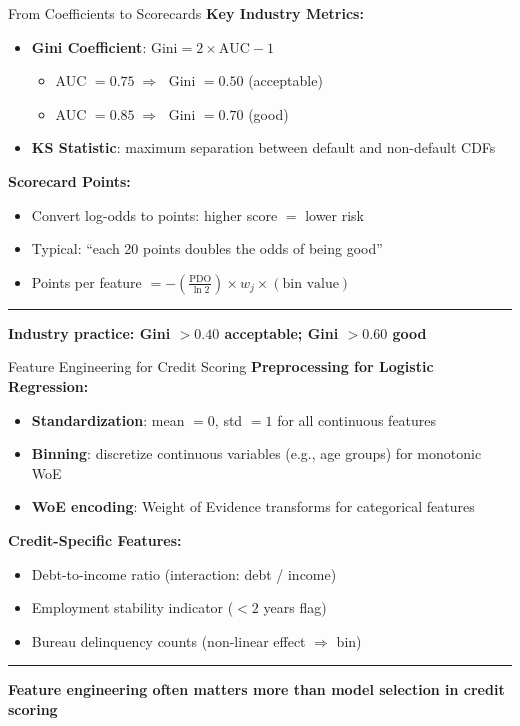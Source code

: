 \documentclass[8pt,aspectratio=169]{beamer}
\newcommand{\bottomnote}[1]{%
\vfill
\vspace{-2mm}
\textcolor{mllavender2}{\rule{\textwidth}{0.4pt}}
\vspace{1mm}
\footnotesize
\textbf{#1}
}
\begin{document}
\begin{frame}[t]{From Coefficients to Scorecards}
\textbf{Key Industry Metrics:}
\begin{itemize}
\item \textbf{Gini Coefficient}: $\text{Gini} = 2 \times \text{AUC} - 1$
  \begin{itemize}
    \item AUC $= 0.75 \;\Rightarrow\;$ Gini $= 0.50$ (acceptable)
    \item AUC $= 0.85 \;\Rightarrow\;$ Gini $= 0.70$ (good)
  \end{itemize}
\item \textbf{KS Statistic}: maximum separation between default and non-default CDFs
\end{itemize}

\vspace{0.3em}
\textbf{Scorecard Points:}
\begin{itemize}
\item Convert log-odds to points: higher score $=$ lower risk
\item Typical: ``each 20 points doubles the odds of being good''
\item Points per feature $= -\left(\frac{\text{PDO}}{\ln 2}\right) \times w_j \times (\text{bin value})$
\end{itemize}
\bottomnote{Industry practice: Gini $> 0.40$ acceptable; Gini $> 0.60$ good}
\end{frame}

\begin{frame}[t]{Feature Engineering for Credit Scoring}
\textbf{Preprocessing for Logistic Regression:}
\begin{itemize}
\item \textbf{Standardization}: mean $= 0$, std $= 1$ for all continuous features
\item \textbf{Binning}: discretize continuous variables (e.g., age groups) for monotonic WoE
\item \textbf{WoE encoding}: Weight of Evidence transforms for categorical features
\end{itemize}
\vspace{0.5em}
\textbf{Credit-Specific Features:}
\begin{itemize}
\item Debt-to-income ratio (interaction: debt / income)
\item Employment stability indicator ($< 2$ years flag)
\item Bureau delinquency counts (non-linear effect $\Rightarrow$ bin)
\end{itemize}
\bottomnote{Feature engineering often matters more than model selection in credit scoring}
\end{frame}
\end{document}
